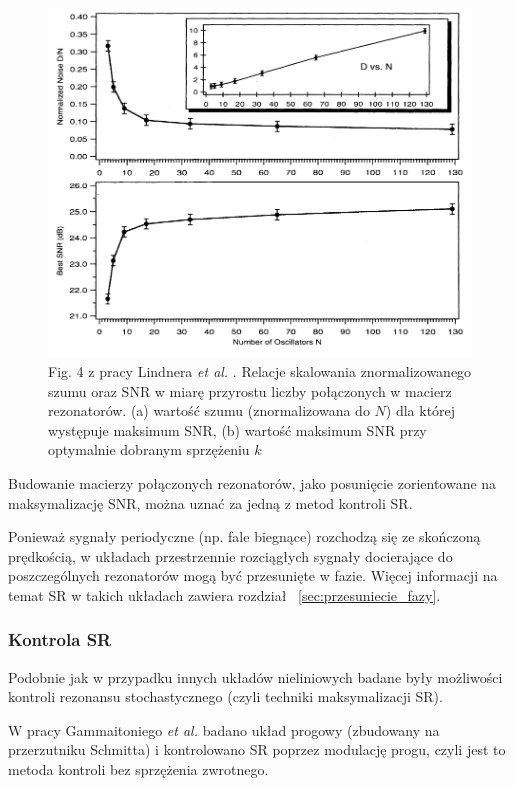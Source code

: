   \begin{figure}
    \includegraphics[width=120mm]{images/lindner_meadows.png}
    \caption{Fig. 4 z pracy Lindnera \emph{et al.} \cite{lindner_meadows}. Relacje skalowania znormalizowanego szumu oraz SNR w miarę przyrostu liczby połączonych w macierz rezonatorów. (a) wartość szumu (znormalizowana do $N$) dla której występuje maksimum SNR, (b) wartość maksimum SNR przy optymalnie dobranym sprzężeniu $k$}
    \label{fig:graphics:lindner_meadows}
  \end{figure}

  Budowanie macierzy połączonych rezonatorów, jako posunięcie zorientowane na maksymalizację SNR, można uznać za jedną z metod kontroli SR.

  Ponieważ sygnały periodyczne (np. fale biegnące) rozchodzą się ze skończoną prędkością, w układach przestrzennie rozciągłych sygnały docierające do poszczególnych rezonatorów mogą być przesunięte w fazie. Więcej informacji na temat SR w takich układach zawiera rozdział ~\ref{sec:przesuniecie_fazy}.

  \subsubsection{Kontrola SR}
  
  Podobnie jak w przypadku innych układów nieliniowych badane były możliwości kontroli rezonansu stochastycznego (czyli techniki maksymalizacji SR). 

  W pracy Gammaitoniego \emph{et al.} \cite{gammaitoni} badano układ progowy (zbudowany na przerzutniku Schmitta) i kontrolowano SR poprzez modulację progu, czyli jest to metoda kontroli bez sprzężenia zwrotnego. 

